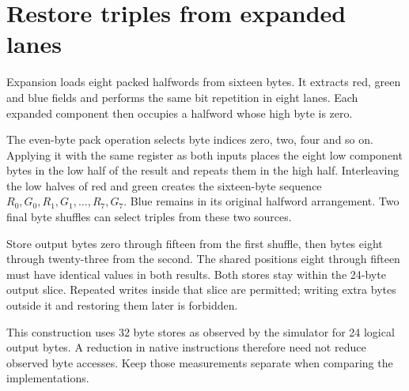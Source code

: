 \section{Restore triples from expanded lanes}\label{rgb-scatter}
Expansion loads eight packed halfwords from sixteen bytes. It extracts red, green
and blue fields and performs the same bit repetition in eight lanes. Each expanded
component then occupies a halfword whose high byte is zero.

The even-byte pack operation selects byte indices zero, two, four and so on. Applying
it with the same register as both inputs places the eight low component bytes in
the low half of the result and repeats them in the high half. Interleaving the
low halves of red and green creates the sixteen-byte sequence
$R_0,G_0,R_1,G_1,\ldots,R_7,G_7$. Blue remains in its original halfword arrangement.
Two final byte shuffles can select triples from these two sources.

Store output bytes zero through fifteen from the first shuffle, then bytes eight
through twenty-three from the second. The shared positions eight through fifteen
must have identical values in both results. Both stores stay within the 24-byte
output slice. Repeated writes inside that slice are permitted; writing extra bytes
outside it and restoring them later is forbidden.

This construction uses 32 byte stores as observed by the simulator for 24 logical
output bytes. A reduction in native instructions therefore need not reduce observed
byte accesses. Keep those measurements separate when comparing the implementations.
